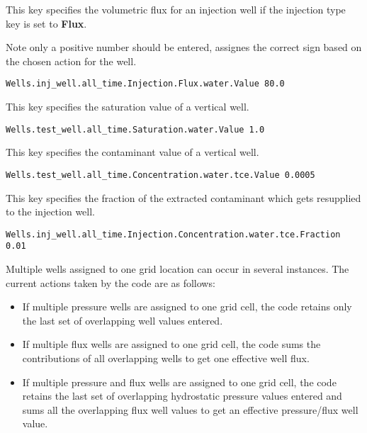 {
This key specifies the volumetric flux for an injection well if the
injection type key is set to {\bf Flux}.

Note only a positive number should be entered, \parflow{} assignes the
correct sign based on the chosen action for the well.
}
\begin{display}\begin{verbatim}
Wells.inj_well.all_time.Injection.Flux.water.Value 80.0
\end{verbatim}\end{display}

{
This key specifies the saturation value of a vertical well.
}
\begin{display}\begin{verbatim}
Wells.test_well.all_time.Saturation.water.Value 1.0
\end{verbatim}\end{display}

{
This key specifies the contaminant value of a vertical well.
}
\begin{display}\begin{verbatim}
Wells.test_well.all_time.Concentration.water.tce.Value 0.0005
\end{verbatim}\end{display}

{
This key specifies the fraction of the extracted contaminant which gets
resupplied to the injection well.
}
\begin{display}\begin{verbatim}
Wells.inj_well.all_time.Injection.Concentration.water.tce.Fraction 0.01
\end{verbatim}\end{display}

\noindent
Multiple wells assigned to one grid location can occur in several
instances.  The current actions taken by the code are as follows:

\begin{itemize}
\item If multiple pressure wells are assigned to one grid cell, the code
      retains only the last set of overlapping well values entered.
\item If multiple flux wells are assigned to one grid cell, the code sums the
      contributions of all overlapping wells to get one effective well flux.
\item If multiple pressure and flux wells are assigned to one grid cell, the
      code retains the last set of overlapping hydrostatic pressure values
      entered and sums all the overlapping flux well values to get an
      effective pressure/flux well value.
\end{itemize}

